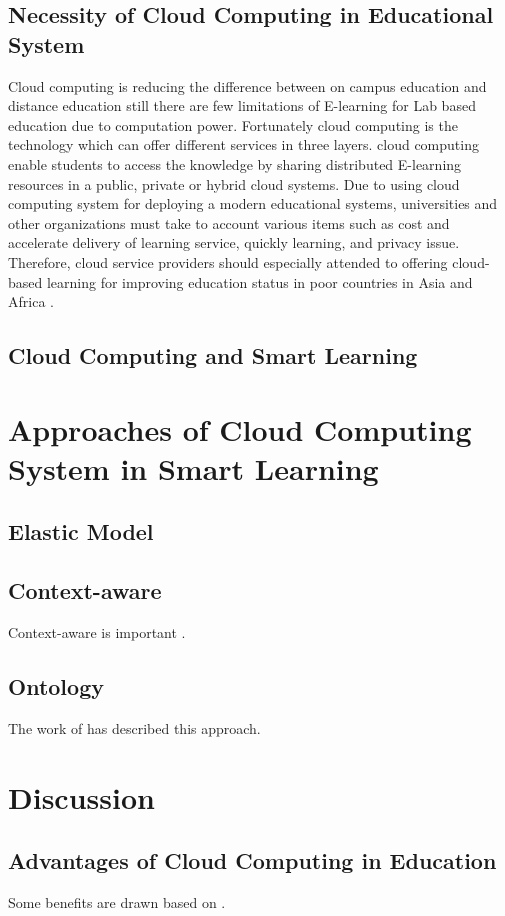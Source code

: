 \documentclass[journal]{vgtc}                %
\begin{document}
  \subsection{Necessity of Cloud Computing in Educational System}
  Cloud computing is reducing the difference between on campus education and distance education still there are few limitations of E-learning for Lab based education due to computation power. Fortunately cloud computing is the technology which can offer different services in three layers. cloud computing enable students to access the knowledge by sharing distributed E-learning resources in a public, private or hybrid cloud systems. Due to using cloud computing system for deploying a modern educational systems, universities and other organizations must take to account various items such as cost and accelerate delivery of learning service, quickly learning, and privacy issue. Therefore, cloud service providers should especially attended to offering cloud-based learning for improving education status in poor countries in Asia and Africa \cite{Bouyer2014}.

  \subsection{Cloud Computing and Smart Learning}

\section{Approaches of Cloud Computing System in Smart Learning}
  \subsection{Elastic Model}
  \subsection{Context-aware}
  Context-aware is important \cite{Pratama2014}.
  \subsection{Ontology}
  The work of \cite{nasr2012proposed} has described this approach.

\section{Discussion} %
  \subsection{Advantages of Cloud Computing in Education} %
  Some benefits are drawn based on \cite{Gonzalez-Martinez2014}.
\end{document}
